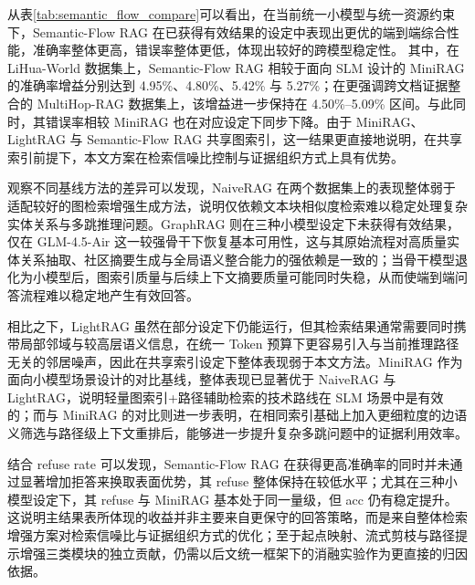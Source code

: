 \documentclass[promaster, vlined]{DissertUESTC}
\begin{document}
从表\ref{tab:semantic_flow_compare}可以看出，在当前统一小模型与统一资源约束下，Semantic-Flow RAG 在已获得有效结果的设定中表现出更优的端到端综合性能，准确率整体更高，错误率整体更低，体现出较好的跨模型稳定性。
其中，在 LiHua-World 数据集上，Semantic-Flow RAG 相较于面向 SLM 设计的 MiniRAG 的准确率增益分别达到 4.95\%、4.80\%、5.42\% 与 5.27\%；在更强调跨文档证据整合的 MultiHop-RAG 数据集上，该增益进一步保持在 4.50\%--5.09\% 区间。与此同时，其错误率相较 MiniRAG 也在对应设定下同步下降。由于 MiniRAG、LightRAG 与 Semantic-Flow RAG 共享图索引，这一结果更直接地说明，在共享索引前提下，本文方案在检索信噪比控制与证据组织方式上具有优势。

观察不同基线方法的差异可以发现，NaiveRAG 在两个数据集上的表现整体弱于适配较好的图检索增强生成方法，说明仅依赖文本块相似度检索难以稳定处理复杂实体关系与多跳推理问题。GraphRAG 则在三种小模型设定下未获得有效结果，仅在 GLM-4.5-Air 这一较强骨干下恢复基本可用性，这与其原始流程对高质量实体关系抽取、社区摘要生成与全局语义整合能力的强依赖是一致的；当骨干模型退化为小模型后，图索引质量与后续上下文摘要质量可能同时失稳，从而使端到端问答流程难以稳定地产生有效回答。

相比之下，LightRAG 虽然在部分设定下仍能运行，但其检索结果通常需要同时携带局部邻域与较高层语义信息，在统一 Token 预算下更容易引入与当前推理路径无关的邻居噪声，因此在共享索引设定下整体表现弱于本文方法。MiniRAG 作为面向小模型场景设计的对比基线，整体表现已显著优于 NaiveRAG 与 LightRAG，说明轻量图索引+路径辅助检索的技术路线在 SLM 场景中是有效的；而与 MiniRAG 的对比则进一步表明，在相同索引基础上加入更细粒度的边语义筛选与路径级上下文重排后，能够进一步提升复杂多跳问题中的证据利用效率。

结合 refuse rate 可以发现，Semantic-Flow RAG 在获得更高准确率的同时并未通过显著增加拒答来换取表面优势，其 refuse 整体保持在较低水平；尤其在三种小模型设定下，其 refuse 与 MiniRAG 基本处于同一量级，但 acc 仍有稳定提升。这说明主结果表所体现的收益并非主要来自更保守的回答策略，而是来自整体检索增强方案对检索信噪比与证据组织方式的优化；至于起点映射、流式剪枝与路径提示增强三类模块的独立贡献，仍需以后文统一框架下的消融实验作为更直接的归因依据。
\end{document}
